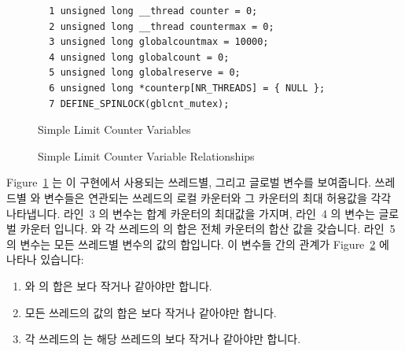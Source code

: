 \begin{figure}[tbp]
{ \scriptsize
\begin{verbatim}
  1 unsigned long __thread counter = 0;
  2 unsigned long __thread countermax = 0;
  3 unsigned long globalcountmax = 10000;
  4 unsigned long globalcount = 0;
  5 unsigned long globalreserve = 0;
  6 unsigned long *counterp[NR_THREADS] = { NULL };
  7 DEFINE_SPINLOCK(gblcnt_mutex);
\end{verbatim}
}
\caption{Simple Limit Counter Variables}
\label{fig:count:Simple Limit Counter Variables}
\end{figure}

\begin{figure}[tb]
\begin{center}
\end{center}
\caption{Simple Limit Counter Variable Relationships}
\label{fig:count:Simple Limit Counter Variable Relationships}
\end{figure}

Figure~\ref{fig:count:Simple Limit Counter Variables} 는 이 구현에서 사용되는
쓰레드별, 그리고 글로벌 변수를 보여줍니다.
쓰레드별  와  변수들은 연관되는 쓰레드의 로컬
카운터와 그 카운터의 최대 허용값을 각각 나타냅니다.
라인~3 의  변수는 합계 카운터의 최대값을 가지며, 라인~4 의
 변수는 글로벌 카운터 입니다.
 와 각 쓰레드의  의 합은 전체 카운터의 합산 값을
갖습니다.
라인~5 의  변수는 모든 쓰레드별  변수의 값의
합입니다.
이 변수들 간의 관계가
Figure~\ref{fig:count:Simple Limit Counter Variable Relationships} 에 나타나
있습니다:
\begin{enumerate}
\item	{} 와  의 합은  보다
	작거나 같아야만 합니다.
\item	모든 쓰레드의  값의 합은  보다 작거나
	같아야만 합니다.
\item	각 쓰레드의  는 해당 쓰레드의  보다 작거나
	같아야만 합니다.
\end{enumerate}
\iffalse

